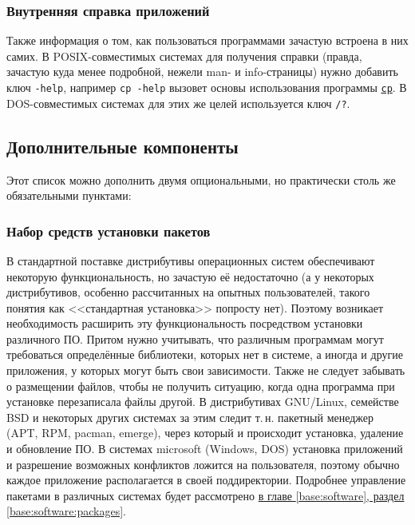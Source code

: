 \subsubsection{Внутренняя справка приложений}
Также информация о том, как пользоваться программами зачастую встроена в них самих. В POSIX-совместимых системах для получения справки (правда, зачастую куда менее подробной, нежели man- и info-стра\-ни\-цы) нужно добавить ключ \texttt{-\text{-}help}, например \texttt{cp -\text{-}help} вызовет основы использования программы \hyperref[base:os:structure:userutils:files]{\texttt{cp}}. В DOS-совместимых системах для этих же целей используется ключ \texttt{/?}.

\subsection{Дополнительные компоненты}\label{base:os:structure:additional}
Этот список можно дополнить двумя опциональными, но практически столь же обязательными пунктами:

\subsubsection{Набор средств установки пакетов}\label{base:os:structure:additional:packagemanager}
В стандартной поставке дистрибутивы операционных систем обеспечивают некоторую функциональность, но зачастую её недостаточно (а у некоторых дистрибутивов, особенно рассчитанных на опытных пользователей, такого понятия как <<стандартная установка>> попросту нет). Поэтому возникает необходимость расширить эту функциональность посредством установки различного ПО.
Притом нужно учитывать, что различным программам могут требоваться определённые библиотеки, которых нет в системе, а иногда и другие приложения, у которых могут быть свои зависимости. Также не следует забывать о размещении файлов, чтобы не получить ситуацию, когда одна программа при установке перезаписала файлы другой.
В дистрибутивах GNU/Linux, семействе BSD и некоторых других системах за этим следит т.\,н. пакетный менеджер (APT, RPM, pacman, emerge), через который и происходит установка, удаление и обновление ПО. В системах microsoft (Windows\texttrademark, DOS) установка приложений и разрешение возможных конфликтов ложится на пользователя, поэтому обычно каждое приложение располагается в своей поддиректории. Подробнее управление пакетами в различных системах будет рассмотрено \hyperref[base:software:packages]{в главе \ref*{base:software}, раздел \ref*{base:software:packages}}.

